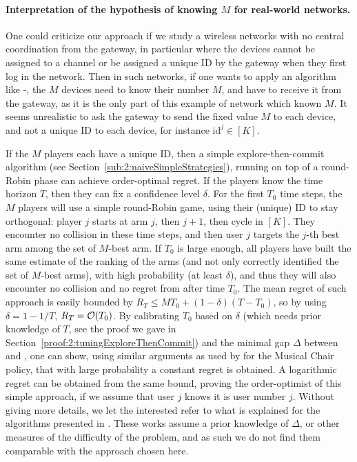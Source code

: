 \paragraph{Interpretation of the hypothesis of knowing $M$ for real-world networks.}
\label{par:5:knowingYourIDinMPBanditsGame}
%
One could criticize our approach if we study a wireless networks with no central coordination from the gateway,
in particular where the devices cannot be assigned to a channel or be assigned a unique ID by the gateway when they first log in the network.
Then in such networks, if one wants to apply an algorithm like \MCTopM-\klUCB,
the $M$ devices need to know their number $M$, and have to receive it from the gateway, as it is the only part of this example of network which known $M$.
It seems unrealistic to ask the gateway to send the fixed value $M$ to each device, and not a unique ID to each device, for instance $\mathrm{id}^j\in[K]$.


If the $M$ players each have a unique ID, then a simple explore-then-commit algorithm (see Section~\ref{sub:2:naiveSimpleStrategies}), running on top of a round-Robin phase can achieve order-optimal regret.
If the players know the time horizon $T$, then they can fix a confidence level $\delta$. For the first $T_0$ time steps, the $M$ players will use a simple round-Robin game, using their (unique) ID to stay orthogonal: player $j$ starts at arm $j$, then $j+1$, then cycle in $[K]$. They encounter no collision in these time steps, and then user $j$ targets the $j$-th best arm among the set of $M$-best arm.
If $T_0$ is large enough, all players have built the same estimate of the ranking of the arms (and not only correctly identified the set of $M$-best arms), with high probability (at least $\delta$), and thus they will also encounter no collision and no regret from after time $T_0$.
The mean regret of such approach is easily bounded by $R_T \leq M T_0 + (1 - \delta) (T - T_0)$, so by using $\delta = 1-1/T$, $R_T = \mathop{}\mathopen{}\mathcal{O}\mathopen{}\left(T_0\right)$.
By calibrating $T_0$ based on $\delta$ (which needs prior knowledge of $T$, see the proof we gave in Section~\ref{proof:2:tuningExploreThenCommit}) and the minimal gap $\Delta$ between \Mbest{} and \Mworst, one can show, using similar arguments as used by \cite{Rosenski16} for the Musical Chair policy, that with large probability a constant regret is obtained. A logarithmic regret can be obtained from the same bound, proving the order-optimist of this simple approach, if we assume that user $j$ knows it is user number $j$.
%
Without giving more details, we let the interested refer to what is explained for the algorithms presented in \cite{DarakHanawal18,JoshiKumar2018,KumarDarak2019}.
%
These works assume a prior knowledge of $\Delta$, or other measures of the difficulty of the problem, and as such we do not find them comparable with the approach chosen here.


